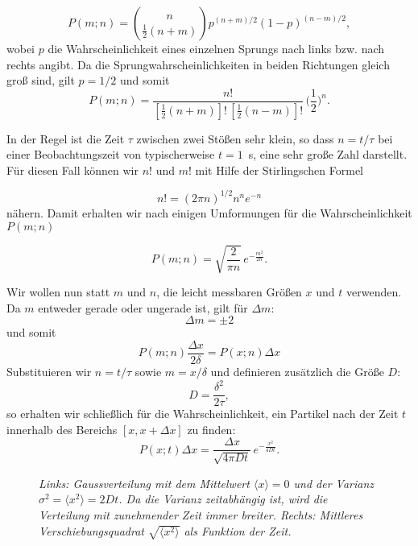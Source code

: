 \documentclass{../papanleitung}
\begin{document}
\begin{equation}
   P(m;n) = \binom{n}{\frac{1}{2}(n+m)} p^{(n+m)/2}
   (1-p)^{(n-m)/2},
\end{equation}
wobei $p$ die Wahrscheinlichkeit eines einzelnen Sprungs nach
links bzw. nach rechts angibt. Da die Sprungwahrscheinlichkeiten
in beiden Richtungen gleich gro{\ss} sind, gilt $p=1/2$ und somit
\begin{equation}
   P(m;n) = \frac{n!}{[\frac{1}{2}(n+m)]!\,[\frac{1}{2}(n-m)]!}\,\biggl(\frac{1}{2}\biggr)^n.
\end{equation}


In der Regel ist die Zeit $\tau$ zwischen zwei St\"{o}{\ss}en sehr klein,
so dass $n=t/\tau$ bei einer Beobachtungszeit von typischerweise
$t = 1$~s, eine sehr gro{\ss}e Zahl darstellt. F\"{u}r diesen Fall k\"{o}nnen
wir $n!$ und $m!$ mit Hilfe der Stirlingschen Formel

\begin{equation}
    n! = (2\pi n)^{1/2} n^n e^{-n}
\end{equation}
n\"{a}hern. Damit erhalten wir nach einigen Umformungen f\"{u}r die
Wahrscheinlichkeit $P(m;n)$

\begin{equation}\label{249_gauss1}
    P(m;n) = \sqrt{\frac{2}{\pi n}}\, e^{-\frac{m^2}{2n}}.
\end{equation}

Wir wollen nun statt $m$ und $n$, die leicht messbaren Gr\"{o}{\ss}en $x$
und $t$ verwenden. Da $m$ entweder gerade oder ungerade ist, gilt
f\"{u}r $\Delta m$:
\begin{equation}
   \Delta m = \pm 2
\end{equation}
und somit
\begin{equation}
 P(m;n)\frac{\Delta x}{2\delta} = P(x;n) \Delta x
\end{equation}
Substituieren wir $n=t/\tau$ sowie $m=x/\delta$ und definieren
zus\"{a}tzlich die Gr\"{o}{\ss}e $D$:
\begin{equation}\label{249_D}
D=\frac{\delta^2}{2\tau},
\end{equation}
so erhalten wir schlie{\ss}lich f\"{u}r die Wahrscheinlichkeit, ein
Partikel nach der Zeit $t$ innerhalb des Bereichs $[x,x+\Delta x]$
zu finden:
\begin{equation}\label{249_gauss2}
    P(x;t) \Delta x = \frac{\Delta x}{\sqrt{4\pi D t}}\,
    e^{-\frac{x^2}{4 D t}}.
\end{equation}

\begin{figure}[h]
\begin{minipage}[c]{12cm}
\centering{}
\caption{\label{249_gaussplot}\fontsize{10}{12}\it Links:
Gaussverteilung mit dem Mittelwert $\langle x \rangle = 0$ und der
Varianz $\sigma^2=\langle x^2 \rangle = 2Dt$. Da die Varianz
zeitabh\"{a}ngig ist, wird die Verteilung mit zunehmender Zeit immer
breiter. Rechts: Mittleres Verschiebungsquadrat $\sqrt{\langle x^2
\rangle}$ als Funktion der Zeit.}
\end{minipage}
\end{figure}
\end{document}
